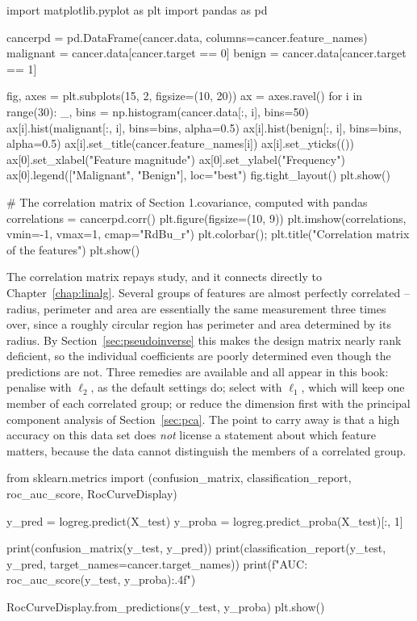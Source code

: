 \begin{Python}{}
import matplotlib.pyplot as plt
import pandas as pd

cancerpd = pd.DataFrame(cancer.data, columns=cancer.feature_names)
malignant = cancer.data[cancer.target == 0]
benign = cancer.data[cancer.target == 1]

fig, axes = plt.subplots(15, 2, figsize=(10, 20))
ax = axes.ravel()
for i in range(30):
    _, bins = np.histogram(cancer.data[:, i], bins=50)
    ax[i].hist(malignant[:, i], bins=bins, alpha=0.5)
    ax[i].hist(benign[:, i], bins=bins, alpha=0.5)
    ax[i].set_title(cancer.feature_names[i])
    ax[i].set_yticks(())
ax[0].set_xlabel("Feature magnitude")
ax[0].set_ylabel("Frequency")
ax[0].legend(["Malignant", "Benign"], loc="best")
fig.tight_layout()
plt.show()

# The correlation matrix of Section 1.covariance, computed with pandas
correlations = cancerpd.corr()
plt.figure(figsize=(10, 9))
plt.imshow(correlations, vmin=-1, vmax=1, cmap="RdBu_r")
plt.colorbar(); plt.title("Correlation matrix of the features")
plt.show()
\end{Python}

The correlation matrix repays study, and it connects directly to
Chapter~\ref{chap:linalg}.  Several groups of features are almost perfectly
correlated -- radius, perimeter and area are essentially the same measurement
three times over, since a roughly circular region has perimeter and area
determined by its radius.  By Section~\ref{sec:pseudoinverse} this makes the
design matrix nearly rank deficient, so the individual coefficients are poorly
determined even though the predictions are not.  Three remedies are available
and all appear in this book: penalise with $\ell_2$, as the default settings
do; select with $\ell_1$, which will keep one member of each correlated group;
or reduce the dimension first with the principal component analysis of
Section~\ref{sec:pca}.  The point to carry away is that a high accuracy on
this data set does \emph{not} license a statement about which feature matters,
because the data cannot distinguish the members of a correlated group.

\begin{Python}{}
from sklearn.metrics import (confusion_matrix, classification_report,
                             roc_auc_score, RocCurveDisplay)

y_pred = logreg.predict(X_test)
y_proba = logreg.predict_proba(X_test)[:, 1]

print(confusion_matrix(y_test, y_pred))
print(classification_report(y_test, y_pred,
                            target_names=cancer.target_names))
print(f"AUC: {roc_auc_score(y_test, y_proba):.4f}")

RocCurveDisplay.from_predictions(y_test, y_proba)
plt.show()
\end{Python}

